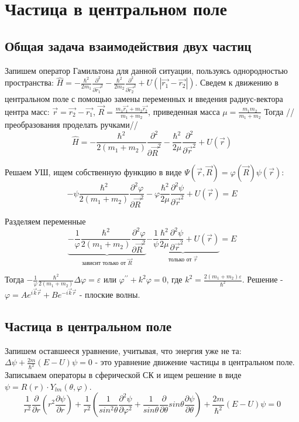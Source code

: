 \newpage
\chapter{Частица в центральном поле}
\section{Общая задача взаимодействия двух частиц}
\par Запишем оператор Гамильтона для данной ситуации, пользуясь однородностью пространства: $\hat{H} = -\frac{\hbar^2}{2m_1} \frac{\partial^2}{\partial \vec{r_1}^2}-\frac{\hbar^2}{2m_2} \frac{\partial^2}{\partial \vec{r_2}^2} + U(|\vec{r_1}-\vec{r_2}|)$. Сведем к движению в центральном поле с помощью замены переменных и введения радиус-вектора центра масс: $\vec{r}=\vec{r_2}-\vec{r_1}$, $\vec{R}=\frac{m_1\vec{r_1}+m_2\vec{r_2}}{m_1+m_2}$, приведенная масса $\mu = \frac{m_1m_2}{m_1+m_2}$ Тогда //преобразования проделать ручками//
$$\hat{H}=-\frac{\hbar^2}{2(m_1+m_2)} \frac{\partial^2}{\partial \vec{R}^2} - \frac{\hbar^2}{2\mu} \frac{\partial^2}{\partial \vec{r}^2} + U(\vec{r})$$
\par Решаем УШ, ищем собственную функцию в виде $\Psi(\vec{r}, \vec{R})=\varphi(\vec{R})\psi(\vec{r})$:
$$-\psi \frac{\hbar^2}{2(m_1+m_2)} \frac{\partial^2\varphi}{\partial \vec{R}^2} -\varphi \frac{\hbar^2}{2\mu} \frac{\partial^2\psi }{\partial \vec{r}^2} + U(\vec{r}) = E$$
\par Разделяем переменные
$$\underbrace{-\frac{1}{\varphi} \frac{\hbar^2}{2(m_1+m_2)} \frac{\partial^2\varphi}{\partial \vec{R}^2}}_{\text{зависит только от } \vec{R}} \underbrace{-\frac{1}{\psi} \frac{\hbar^2}{2\mu} \frac{\partial^2\psi }{\partial \vec{r}^2} + U(\vec{r})}_{\text{только от } \vec{r}} = E$$
\par Тогда $-\frac{1}{\varphi} \frac{\hbar^2}{2(m_1+m_2)} \Delta \varphi = \varepsilon$ или $\varphi^{\prime \prime} +k^2 \varphi =0$, где $k^2=\frac{2(m_1+m_2)\varepsilon}{\hbar^2}$. Решение - $\varphi = A e^{i \vec{k}\vec{r}}+B e^{-i \vec{k}\vec{r}}$ - плоские волны.
\section{Частица в центральном поле}
\par Запишем оставшееся уравнение, учитывая, что энергия уже не та: $\Delta \psi +\frac{2m}{\hbar^2} (E-U)\psi = 0$ - это уравнение движение частицы в центральном поле. Записываем операторы в сферической СК и ищем решение в виде $\psi = R(r)\cdot Y_{lm}(\theta, \varphi)$.
$$ \frac{1}{r^2}\frac{\partial}{\partial r}\left(r^2  \frac{\partial \psi}{\partial r} \right) +\frac{1}{r^2} \left( \frac{1}{sin^2\theta} \frac{\partial^2\psi}{\partial \varphi^2} +\frac{1}{sin\theta} \frac{\partial }{\partial \theta}sin \theta \frac{\partial \psi}{\partial \theta}\right) +\frac{2m}{\hbar^2} (E-U)\psi =0$$

